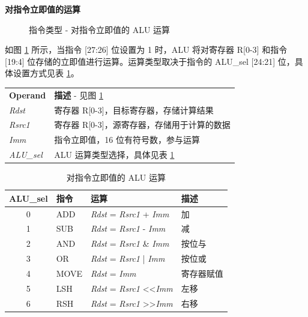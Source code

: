 \documentclass[main\_\_CN.tex]{subfiles}
\begin{document}
\textcolor{istcolor}{\textbf{ 对指令立即值的运算}}

%
%
%
%
%
%
%
%
\begin{figure}[H]
    \centering
    \caption{指令类型 - 对指令立即值的 ALU 运算}
    \label{fig:ALU-with-immediate-value}
\end{figure}

\vspace{-2em}
如图 \ref{fig:ALU-with-immediate-value} 所示，当指令 [27:26] 位设置为 1 时，ALU 将对寄存器 R[0-3] 和指令 [19:4] 位存储的立即值进行运算。运算类型取决于指令的 ALU\_sel [24:21] 位，具体设置方式见表 \ref{tab:ALU-with-immediate-value}。

\begin{tabular}{ l l }
\textbf{Operand} & \textbf{描述} - 见图 \ref{fig:ALU-with-immediate-value} \\
\textit{Rdst} & 寄存器 R[0-3]，目标寄存器，存储计算结果 \\
\textit{Rsrc1} & 寄存器 R[0-3]，源寄存器，存储用于计算的数据 \\
\textit{Imm} & 指令立即值，16 位有符号数，参与运算 \\
\textit{ALU\_sel} & ALU 运算类型选择，具体见表 \ref{tab:ALU-with-immediate-value}
\end{tabular}

\begin{table}[H]
    \centering
    \begin{tabular}{ c l l l }
    \textbf{ALU\_sel} & \textbf{指令} & \textbf{运算} & \textbf{描述} \\ \hline
    0 & ADD & \textit{Rdst} = \textit{Rsrc1} + \textit{Imm} & 加 \\
    1 & SUB & \textit{Rdst} = \textit{Rsrc1} - \textit{Imm} & 减 \\
    2 & AND & \textit{Rdst} = \textit{Rsrc1} \& \textit{Imm} & 按位与 \\
    3 & OR & \textit{Rdst} = \textit{Rsrc1} | \textit{Imm} & 按位或 \\
    4 & MOVE & \textit{Rdst} = \textit{Imm} & 寄存器赋值 \\
    5 & LSH & \textit{Rdst} = \textit{Rsrc1} \textless\textless\textvisiblespace \textit{Imm} & 左移 \\
    6 & RSH & \textit{Rdst} = \textit{Rsrc1} \textgreater\textgreater\textvisiblespace \textit{Imm} & 右移 \\
    \end{tabular}
    \caption{对指令立即值的 ALU 运算}
    \label{tab:ALU-with-immediate-value}
\end{table}
\end{document}
